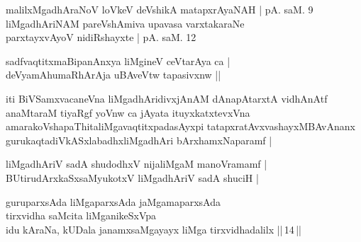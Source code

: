 \begin{entry}
\gl{}
\begin{shl}
malilxMgadhAraNoV loVkeV deVshikA matapxrAyaNAH | pA. saM. 9\\
liMgadhAriNAM pareVshAmiva upavasa varxtakaraNe\\
parxtayxvAyoV nidiRshayxte | pA. saM. 12
\end{shl}
\end{entry}

\begin{entry}
\begin{shl}
sadfvaqtitxmaBipanAnxya liMgineV ceVtarAya ca |\\
deVyamAhumaRhArAja uBAveVtw tapasivxnw ||
\end{shl}
\begin{shl}
iti BiVSamxvacaneVna liMgadhAridivxjAnAM dAnapAtarxtA vidhAnAtf anaMtaraM tiyaRgf yoVnw ca jAyata ituyxkatxtevxVna amarakoVshapaThitaliMgavaqtitxpadasAyxpi tatapxratAvxvashayxMBAvAnanx gurukaqtadiVkASxlabadhxliMgadhAri bArxhamxNaparamf |
\end{shl}
\end{entry}

\begin{entry}
\begin{shl}
liMgadhAriV sadA shudodhxV nijaliMgaM manoVramamf |\\
BUtirudArxkaSxsaMyukotxV liMgadhAriV sadA shuciH |
\end{shl}
\end{entry}

\begin{entry}
\gl{}
\begin{shl}
guruparxsAda liMgaparxsAda jaMgamaparxsAda\\
tirxvidha saMcita liMganikeSxVpa\\
idu kAraNa, kUDala janamxsaMgayayx liMga tirxvidhadalilx ||\,14\,||
\end{shl}
\end{entry}

